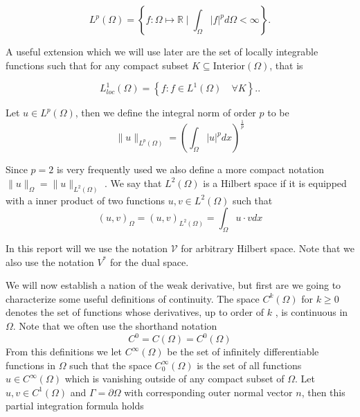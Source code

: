 \begin{equation*}
    L^{p}\left( \Omega  \right) = \left\{ f: \Omega \mapsto \mathbb{R}  \mid \int_{\Omega }^{} \left\lvert f \right\rvert ^{p} d \Omega  < \infty  \right\}
.\end{equation*}

A useful extension which we will use later are the set of locally integrable functions such that for any compact subset $K \subseteq \text{Interior}\left( \Omega  \right) $, that is

\begin{equation*}
    L_{loc}^{1}\left( \Omega  \right)  = \left\{ f: f \in L^{1}\left( \Omega  \right)  \quad \forall K  \right\}.
.\end{equation*}


Let $u \in L^{p}\left( \Omega  \right) $, then we define the integral norm of order $p$ to be \[
\| u \|_{ L^{p}\left( \Omega  \right)  }^{  }  = \left( \int_{\Omega }^{} \left\lvert u \right\rvert ^{p} dx  \right) ^{\frac{1}{p}}
\]

Since $p=2$ is very frequently used we also define a more compact notation $\| u \|_{ \Omega  }^{  }  = \| u \|_{ L^{2}\left( \Omega  \right)  }^{  } $ .  We say that $L^{2}\left( \Omega  \right) $ is a Hilbert space if it is equipped with a inner
product of two functions $u,v \in L^{2}\left( \Omega  \right) $ such that
\[
\left( u,v \right) _{\Omega } = \left( u,v \right) _{L^2\left( \Omega  \right) } = \int_{\Omega }^{} u \cdot v dx
\]

In this report will we use the notation $\mathcal{V} $ for arbitrary Hilbert space. Note that we also use the notation $V^{*}$ for the dual space.

We will now establish a nation of the weak derivative, but first are we going to characterize some useful definitions of continuity. The space $C^{k}\left( \Omega  \right) $ for $k\ge 0$ denotes the set of functions whose derivatives, up to order of
$k$ , is continuous in $\Omega $. Note that we often use the shorthand notation \[
C^{0} = C\left( \Omega  \right)  = C^{0}\left( \Omega  \right)
\]
From this definitions we let $C^{\infty}\left( \Omega  \right) $ be the set of infinitely differentiable functions in $\Omega $ such that the space $C^{\infty}_{0}\left( \Omega  \right)$ is the set of all functions $u \in C^{\infty}\left( \Omega
\right) $ which is vanishing outside of any compact subset of $\Omega $. Let $u,v \in  C^{1}\left( \Omega  \right) $ and $\Gamma  = \partial \Omega $ with corresponding outer normal vector $n$, then this partial integration formula holds

